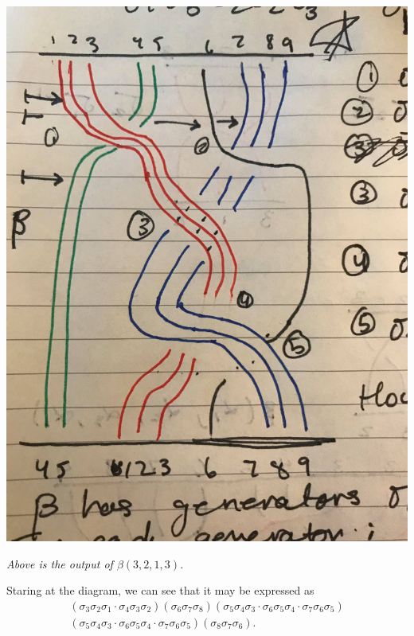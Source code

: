\begin{center}
    \hspace{1cm}
    \raisebox{2cm}{$\mapsto$}
    \hspace{1cm}
    \includegraphics[scale = 0.05]{chp9_operads/braids.jpg}
    
    \emph{Above is the output of $\beta(3, 2, 1, 3)$.}
\end{center}
Staring at the diagram, we can see that it may be expressed as
\begin{gather*}
    (\sigma_3\sigma_2\sigma_1 \cdot \sigma_4\sigma_3\sigma_2) (\sigma_6\sigma_7\sigma_8) 
    (\sigma_5\sigma_4\sigma_3 \cdot \sigma_6\sigma_5\sigma_4 \cdot \sigma_7\sigma_6\sigma_5)\\
    (\sigma_5\sigma_4\sigma_3 \cdot \sigma_6\sigma_5\sigma_4 \cdot \sigma_7\sigma_6\sigma_5)
    (\sigma_8 \sigma_7 \sigma_6).
\end{gather*}
